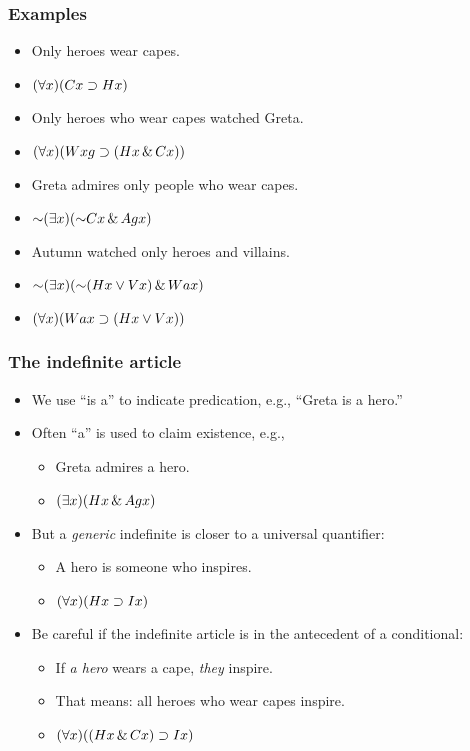 \begin{frame}
\frametitle{Examples}

\begin{itemize}[<+->]
  \item Only heroes wear capes.\\
  \item[] \alert{$(\forall x)(Cx \supset Hx)$}
  \item Only heroes who wear capes watched Greta.\\
  \item[] \alert{$(\forall x)(Wxg \supset (Hx \,\&\, Cx))$}
  \item Greta admires only people who wear capes.
  \item[] \alert{$\enot\qt{\exists}{x}(\enot  C\qv{x} \eand A\qr{g}{x})$}
  \item Autumn watched only heroes and villains.
  \item[] \alert{$\enot\qt{\exists}{x}(\enot (H\qv{x} \eor V\qv{x}) \eand W\qr{a}{x})$}
  \item[] \alert{$(\forall x)(Wax \supset (Hx \vee Vx))$}
\end{itemize}
\end{frame}

\begin{frame}
\frametitle{The indefinite article}

\begin{itemize}[<+->]
  \item We use ``is a'' to indicate predication, e.g., ``Greta is a hero.''
  \item Often ``a'' is used to claim existence, e.g.,
  \begin{itemize}[<+->]
    \item[] Greta admires a hero.
    \item[] \alert{$(\exists x) (Hx \,\&\, Agx)$}
  \end{itemize}
  \item But a \emph{generic} indefinite is closer to a
  universal quantifier:
  \begin{itemize}[<+->]
    \item[] A hero is someone who inspires.
    \item[] \alert{$(\forall x)(Hx \supset Ix)$}
  \end{itemize}
  \item Be careful if the indefinite article is in the antecedent of a conditional:
  \begin{itemize}[<+->]
    \item[] If \emph{a hero} wears a cape, \emph{they} inspire.
    \item[] That means: all heroes who wear capes inspire.
    \item[] \alert{$(\forall x)((Hx \,\&\, Cx) \supset Ix)$}
  \end{itemize}
\end{itemize}
\end{frame}

